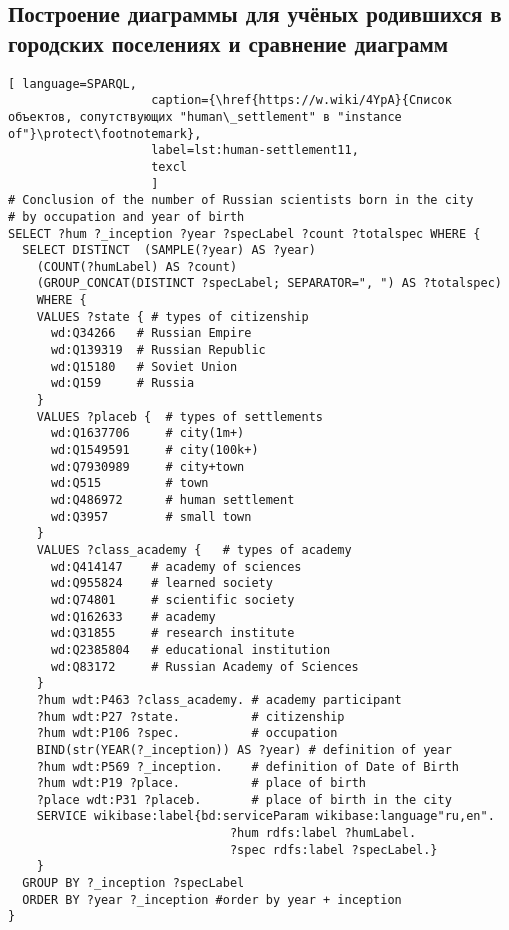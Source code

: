 \subsection{Построение диаграммы для учёных родившихся в городских поселениях и сравнение диаграмм}

\lstset{numbers=left, firstnumber=1, frame=single}
\begin{lstlisting}[ language=SPARQL, 
                    caption={\href{https://w.wiki/4YpA}{Cписок объектов, сопутствующих "human\_settlement" в "instance of"}\protect\footnotemark},
                    label=lst:human-settlement11,
                    texcl 
                    ]
# Conclusion of the number of Russian scientists born in the city 
# by occupation and year of birth
SELECT ?hum ?_inception ?year ?specLabel ?count ?totalspec WHERE {
  SELECT DISTINCT  (SAMPLE(?year) AS ?year) 
	(COUNT(?humLabel) AS ?count)  
	(GROUP_CONCAT(DISTINCT ?specLabel; SEPARATOR=", ") AS ?totalspec) 
	WHERE {
    VALUES ?state { # types of citizenship
      wd:Q34266   # Russian Empire 
      wd:Q139319  # Russian Republic
      wd:Q15180   # Soviet Union
      wd:Q159     # Russia
    }
    VALUES ?placeb {  # types of settlements
      wd:Q1637706     # city(1m+)
      wd:Q1549591     # city(100k+)
      wd:Q7930989     # city+town
      wd:Q515         # town
      wd:Q486972      # human settlement
      wd:Q3957        # small town
    }
    VALUES ?class_academy {   # types of academy
      wd:Q414147    # academy of sciences 
      wd:Q955824    # learned society
      wd:Q74801     # scientific society
      wd:Q162633    # academy
      wd:Q31855     # research institute
      wd:Q2385804   # educational institution
      wd:Q83172     # Russian Academy of Sciences
    }
    ?hum wdt:P463 ?class_academy. # academy participant
    ?hum wdt:P27 ?state.          # citizenship
    ?hum wdt:P106 ?spec.          # occupation
    BIND(str(YEAR(?_inception)) AS ?year) # definition of year
    ?hum wdt:P569 ?_inception.    # definition of Date of Birth
    ?hum wdt:P19 ?place.          # place of birth
    ?place wdt:P31 ?placeb.       # place of birth in the city
    SERVICE wikibase:label{bd:serviceParam wikibase:language"ru,en".
                               ?hum rdfs:label ?humLabel.
                               ?spec rdfs:label ?specLabel.}
    }
  GROUP BY ?_inception ?specLabel
  ORDER BY ?year ?_inception #order by year + inception
}
\end{lstlisting}%


